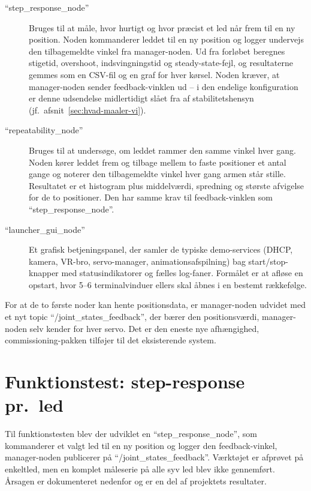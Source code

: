 \begin{description}
    \item[\enquote{step\_response\_node}] Bruges til at måle, hvor
        hurtigt og hvor præcist et led når frem til en ny position.
        Noden kommanderer leddet til en ny position og logger
        undervejs den tilbagemeldte vinkel fra manager-noden.
        Ud fra forløbet beregnes stigetid, overshoot,
        indsvingningstid og steady-state-fejl, og resultaterne
        gemmes som en CSV-fil og en graf for hver kørsel. Noden
        kræver, at manager-noden sender feedback-vinklen ud --
        i den endelige konfiguration er denne udsendelse
        midlertidigt slået fra af stabilitetshensyn
        (jf.~afsnit~\ref{sec:hvad-maaler-vi}).
    \item[\enquote{repeatability\_node}] Bruges til at undersøge,
        om leddet rammer den samme vinkel hver gang. Noden kører
        leddet frem og tilbage mellem to faste positioner et
        antal gange og noterer den tilbagemeldte vinkel hver
        gang armen står stille. Resultatet er et histogram plus
        middelværdi, spredning og største afvigelse for de to
        positioner. Den har samme krav til feedback-vinklen som
        \enquote{step\_response\_node}.
    \item[\enquote{launcher\_gui\_node}] Et grafisk
        betjeningspanel, der samler de typiske demo-services
        (DHCP, kamera, VR-bro, servo-manager,
        animationsafspilning) bag start/stop-knapper med
        statusindikatorer og fælles log-faner. Formålet er at
        afløse en opstart, hvor 5--6 terminalvinduer ellers skal
        åbnes i en bestemt rækkefølge.
\end{description}

For at de to første noder kan hente positionsdata, er
manager-noden udvidet med et nyt topic
\enquote{/joint\_states\_feedback}, der bærer den positionsværdi,
manager-noden selv kender for hver servo. Det er den eneste nye
afhængighed, commissioning-pakken tilføjer til det eksisterende
system.

\clearpage
\section{Funktionstest: step-response pr.~led}

Til funktionstesten blev der udviklet en
\enquote{step\_response\_node}, som kommanderer et valgt led til
en ny position og logger den feedback-vinkel, manager-noden
publicerer på \enquote{/joint\_states\_feedback}. Værktøjet er
afprøvet på enkeltled, men en komplet måleserie på alle syv led
blev ikke gennemført. Årsagen er dokumenteret nedenfor og er en
del af projektets resultater.

